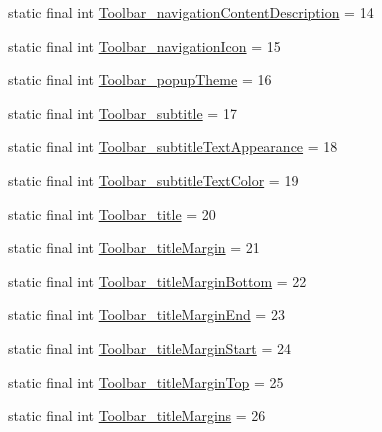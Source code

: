 \begin{DoxyCompactItemize}
\item 
static final int \mbox{\hyperlink{classandroid_1_1support_1_1design_1_1R_1_1styleable_ac7031f062e44f6d4cea72520507e1703}{Toolbar\+\_\+navigation\+Content\+Description}} = 14
\item 
static final int \mbox{\hyperlink{classandroid_1_1support_1_1design_1_1R_1_1styleable_accd16d6faeffbd100a41b9e447a49189}{Toolbar\+\_\+navigation\+Icon}} = 15
\item 
static final int \mbox{\hyperlink{classandroid_1_1support_1_1design_1_1R_1_1styleable_a85ad1e9a88b243c3cb9ac4a4eff2e59d}{Toolbar\+\_\+popup\+Theme}} = 16
\item 
static final int \mbox{\hyperlink{classandroid_1_1support_1_1design_1_1R_1_1styleable_a0364d79d02071a50c5e5716dab29c5ab}{Toolbar\+\_\+subtitle}} = 17
\item 
static final int \mbox{\hyperlink{classandroid_1_1support_1_1design_1_1R_1_1styleable_a5f9e967ec77cd237d74b93e364172559}{Toolbar\+\_\+subtitle\+Text\+Appearance}} = 18
\item 
static final int \mbox{\hyperlink{classandroid_1_1support_1_1design_1_1R_1_1styleable_af80f7c0e024f277f72f31c36c9a8b256}{Toolbar\+\_\+subtitle\+Text\+Color}} = 19
\item 
static final int \mbox{\hyperlink{classandroid_1_1support_1_1design_1_1R_1_1styleable_a11e8147b2ddb5ab456b7530c9fb3fce2}{Toolbar\+\_\+title}} = 20
\item 
static final int \mbox{\hyperlink{classandroid_1_1support_1_1design_1_1R_1_1styleable_aeced67b1a8dbb0c5b8d240e3ddeb4bf9}{Toolbar\+\_\+title\+Margin}} = 21
\item 
static final int \mbox{\hyperlink{classandroid_1_1support_1_1design_1_1R_1_1styleable_a8a74fa3c25fd104e2317f2d59163a0a1}{Toolbar\+\_\+title\+Margin\+Bottom}} = 22
\item 
static final int \mbox{\hyperlink{classandroid_1_1support_1_1design_1_1R_1_1styleable_a33489940e504cd17320b0791518b1800}{Toolbar\+\_\+title\+Margin\+End}} = 23
\item 
static final int \mbox{\hyperlink{classandroid_1_1support_1_1design_1_1R_1_1styleable_aaa2847451f4babb9f8453a3ab3f1437b}{Toolbar\+\_\+title\+Margin\+Start}} = 24
\item 
static final int \mbox{\hyperlink{classandroid_1_1support_1_1design_1_1R_1_1styleable_ab372cb599a5074e8cc57f44c95430812}{Toolbar\+\_\+title\+Margin\+Top}} = 25
\item 
static final int \mbox{\hyperlink{classandroid_1_1support_1_1design_1_1R_1_1styleable_a7a7c87d2d30eb1c42aba4dc93e811b9f}{Toolbar\+\_\+title\+Margins}} = 26

\end{DoxyCompactItemize}
